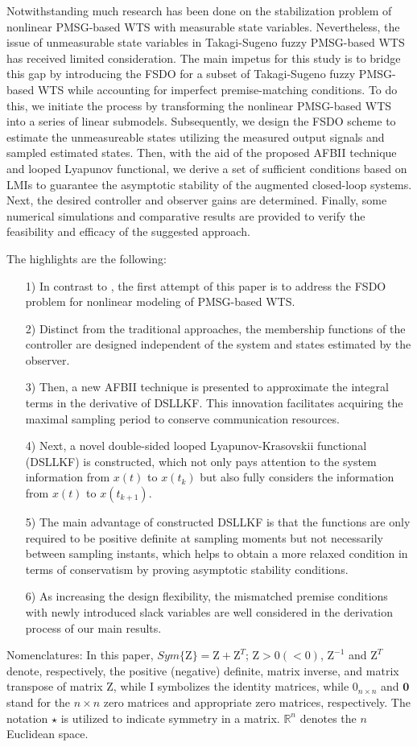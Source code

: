 \documentclass[preprint,11pt]{elsarticle}
\begin{document}
Notwithstanding much research has been done on the stabilization problem of nonlinear PMSG-based WTS with measurable state variables. Nevertheless, the issue of unmeasurable state variables in {Takagi-Sugeno} fuzzy PMSG-based WTS has received limited consideration. The main impetus for this study is to bridge this gap by introducing the FSDO for a subset of {Takagi-Sugeno} fuzzy PMSG-based WTS while accounting for imperfect premise-matching conditions. To do this, we initiate the process by transforming the nonlinear PMSG-based WTS into a series of linear submodels. Subsequently, we design the FSDO scheme to estimate the unmeasureable states utilizing the measured output signals and sampled estimated states. Then, with the aid of the proposed AFBII technique and looped Lyapunov functional, we derive a set of sufficient conditions based on LMIs to guarantee the asymptotic stability of the augmented closed-loop systems. Next, the desired controller and observer gains are determined. Finally, some numerical simulations and comparative results are provided to verify the feasibility and efficacy of the suggested approach. {The highlights are the following:
\begin{itemize}
\item[1)] In contrast to \cite{sub1},  the first attempt of this paper is to address the FSDO problem for nonlinear modeling of PMSG-based WTS.
\item[2)] Distinct from the traditional approaches, the membership functions of the controller are designed independent of the system and states estimated by the observer.
\item[3)] Then, a new AFBII technique is presented to approximate the integral terms in the derivative of DSLLKF. This innovation facilitates acquiring the maximal sampling period to conserve communication resources.
\item [4)] Next, a novel double-sided looped Lyapunov-Krasovskii functional (DSLLKF) is constructed, which not only pays attention to the system information from $x(t)$ to $x(t_{k})$ but also fully considers the information from $x(t)$ to $x(t_{k+1})$.
\item[5)] The main advantage of constructed DSLLKF is that the functions are only required to be positive definite at sampling moments but not necessarily between sampling instants, which helps to obtain a more relaxed condition in terms of conservatism by proving asymptotic stability conditions.
\item[6)] As increasing the design flexibility, the mismatched premise conditions with newly introduced slack variables are well considered in the derivation process of our main results.
\end{itemize}
}
Nomenclatures: In this paper, $Sym\{ \mathrm{Z}\}=\mathrm{Z}+\mathrm{Z}^{T}$; $\mathrm{Z}>0(<0)$, $\mathrm{Z}^{-1}$ and $\mathrm{Z}^{T}$ denote, respectively, the positive (negative) definite,  matrix inverse, and matrix transpose of matrix $\mathrm{Z}$, while $\mathrm{I}$ symbolizes the identity matrices, while $0_{n\times n}$ and $\mathbf{0}$ stand for the $n\times n$ zero matrices and appropriate zero matrices, respectively. The notation $\star$ is utilized to indicate symmetry in a matrix. $\mathbb{R}^{n}$ denotes the $n$ Euclidean space.
\vspace{-0.5cm}
\end{document}
